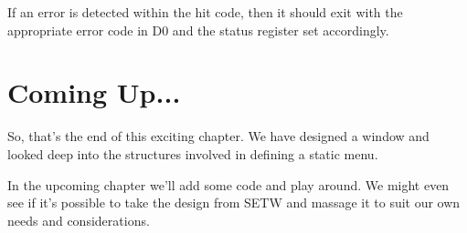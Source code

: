 If an error is detected within the hit code, then it should exit
    with the appropriate error code in D0 and the status register set
    accordingly.

\section{Coming Up...}
\label{ch29-the-end}%

So, that's the end of this exciting chapter. We have designed a
    window and looked deep into the structures involved in defining a static
    menu. 
    
In the upcoming chapter we'll add some code and play around. We might even see if
    it's possible to take the design from SETW and
    massage it to suit our own needs and considerations.

